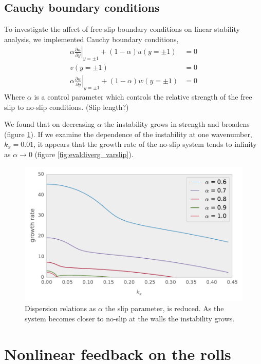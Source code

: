 \documentclass{jfm}
\newcommand{\dy}[1]{\frac{\partial #1}{\partial y}}
\begin{document}
\subsection{Cauchy boundary conditions}\label{sec:Cauchy}

To investigate the affect of free slip boundary conditions on linear stability
analysis, we implemented Cauchy boundary conditions,
\begin{align}
    \alpha\left.\dy{u}\right|_{y=\pm1} + (1-\alpha)u(y=\pm1) &= 0 \\
    v(y=\pm1) &=0 \\
    \alpha\left.\dy{w}\right|_{y=\pm1} + (1-\alpha)w(y=\pm1) &= 0 
\end{align}
Where $\alpha$ is a control parameter which controls the relative strength of
the free slip to no-slip conditions. (Slip length?)

We found that on decreasing $\alpha$ the instability grows in strength and
broadens (figure \ref{fig:dispersions_varslip}). If we examine the dependence
of the instability at one wavenumber, $k_{x}=0.01$, it appears that the growth
rate of the no-slip system tends to infinity as $\alpha \rightarrow 0$ (figure
\ref{fig:evaldiverg_varslip}).

\begin{figure}
    \centering
    \includegraphics[width=\textwidth]{./figures/dispersions_varslip}
    \caption{
	Dispersion relations as $\alpha$ the slip parameter, is reduced. As the
	system becomes closer to no-slip at the walls the instability grows.
    }
    \label{fig:dispersions_varslip}
\end{figure}

\section{Nonlinear feedback on the rolls}\label{sec:nonlinear_feedback}
\end{document}
